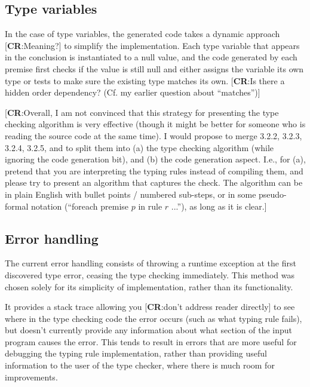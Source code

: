 \documentclass[nofilelist]{cslthse-msc}
\newcommand{\CR}[1]{\textcolor{green!60!black}{[\textbf{CR}:#1]}}
\begin{document}
\subsection{Type variables}
In the case of type variables, the generated code takes a dynamic approach \CR{Meaning?} to simplify the implementation.
Each type variable that appears in the conclusion is instantiated to a null value, and the code generated by each premise first checks if the value is still null and either assigns the variable its own type or tests to make sure the existing type matches its own.
\CR{Is there a hidden order dependency? (Cf. my earlier question about ``matches'')}

\CR{Overall, I am not convinced that this strategy for presenting the type checking algorithm
  is very effective (though it might be better for someone who is reading the source code at the same time).
  I would propose to merge 3.2.2, 3.2.3, 3.2.4, 3.2.5, and to split them into (a) the type checking algorithm
  (while ignoring the code generation bit), and (b) the code generation aspect.  I.e., for (a), pretend that you are
  interpreting the typing rules instead of compiling them, and please try to present an algorithm that captures
  the check.  The algorithm can be in plain English with bullet points / numbered sub-steps, or in some pseudo-formal
  notation (``foreach premise $p$ in rule $r$ ...''), as long as it is clear.}


\subsection{Error handling}\label{errorhandling}
The current error handling consists of throwing a runtime exception at the first discovered type error, ceasing the type checking immediately.
This method was chosen solely for its simplicity of implementation, rather than its functionality.

It provides a stack trace allowing you \CR{don't address reader directly} to see where in the type checking code the error occurs (such as what typing rule fails), but doesn't currently provide any information about what section of the input program causes the error.
This tends to result in errors that are more useful for debugging the typing rule implementation, rather than providing useful information to the user of the type checker, where there is much room for improvements.
\end{document}
